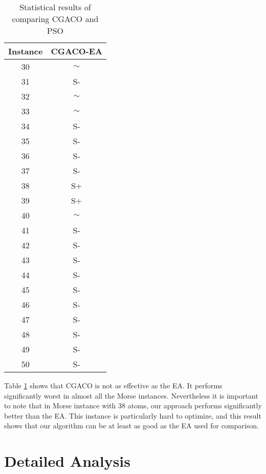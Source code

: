 			\begin{table}[!htdp]
					\label{tab:statistical_comparison_ea}
					\begin{center}
						\begin{tabular}{| c | c |}
							\hline
							\textbf{Instance} & \textbf{CGACO-EA} \\ \hline
							30 & $\sim$ \\ \hline
							31 & S- \\ \hline
							32 & $\sim$ \\ \hline
							33 & $\sim$ \\ \hline
							34 & S- \\ \hline
							35 & S- \\ \hline
							36 & S- \\ \hline
							37 & S- \\ \hline
							38 & S+ \\ \hline
							39 & S+ \\ \hline
							40 & $\sim$ \\\hline
							41 & S- \\ \hline
							42 & S- \\ \hline
							43 & S- \\ \hline
							44 & S- \\ \hline
							45 & S- \\ \hline
							46 & S- \\ \hline
							47 & S- \\ \hline
							48 & S- \\ \hline 
							49 & S- \\ \hline
							50 & S- \\ \hline
						\end{tabular}
						\caption{Statistical results of comparing CGACO and PSO}
					\end{center}
			\end{table}
		Table \ref{tab:statistical_comparison_ea} shows that CGACO is not as effective as the EA. It performs significantly worst in almost all the Morse instances. Nevertheless it is important to note that in Morse instance with 38 atoms, our approach performs significantly better than the EA. This instance is particularly hard to optimize, and this result shows that our algorithm can be at least as good as the EA used for comparison.
		
		\section{Detailed Analysis}
	
	

	